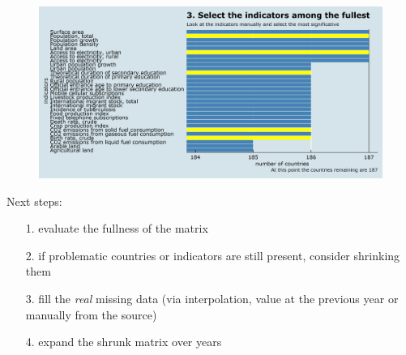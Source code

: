 \documentclass[9pt]{beamer}
\begin{document}
\begin{frame}
\begin{figure}
\centering
\includegraphics[width=\textwidth]{plot0007.png}
\end{figure}
\end{frame}

\begin{frame}
Next steps:
\begin{itemize} [<+->]
	\item[1.] evaluate the fullness of the matrix
	\item[2.] if problematic countries or indicators are still present, consider shrinking them
	\item[3.] fill the \textit{real} missing data (via interpolation, value at the previous year or manually from the source)
	\item[4.] expand the shrunk matrix over years 
\end{itemize}
\end{frame}
\end{document}
